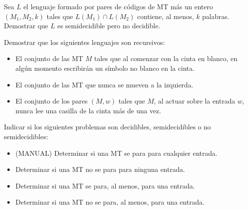 
\begin{ejercicio}
    Sea $L$ el lenguaje formado por pares de códigos de MT más un entero $(M_1 ,M_2 , k)$ tales que $L(M_1) \cap L(M_2)$ contiene, al menos, $k$ palabras. Demostrar que $L$ es semidecidible pero no decidible.
\end{ejercicio}


\begin{ejercicio}
    Demostrar que los siguientes lenguajes son recursivos:
    \begin{itemize}
        \item[a)] El conjunto de las MT $M$ tales que al comenzar con la cinta en blanco, en algún momento escribirán un símbolo no blanco en la cinta.
        \item[b)] El conjunto de las MT que nunca se mueven a la izquierda.
        \item[c)] El conjunto de los pares $(M, w)$ tales que $M$, al actuar sobre la entrada $w$, nunca lee una casilla de la cinta más de una vez.
    \end{itemize}
\end{ejercicio}


\begin{ejercicio}
    Indicar si los siguientes problemas son decidibles, semidecidibles o no semidecidibles:
    \begin{itemize}
        \item[a)] (MANUAL) Determinar si una MT se para para cualquier entrada.
        \item[b)] Determinar si una MT no se para para ninguna entrada.
        \item[c)] Determinar si una MT se para, al menos, para una entrada.
        \item[d)] Determinar si una MT no se para, al menos, para una entrada.
    \end{itemize}
\end{ejercicio}


